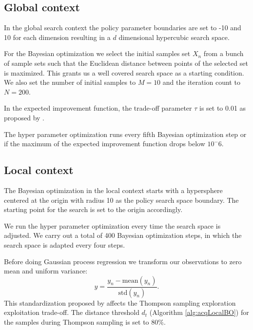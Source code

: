 \subsection{Global context}

In the global search context the policy parameter boundaries are set to -10 and 10 for each dimension resulting in a $d$ dimensional hypercubic search space.

For the Bayesian optimization we select the initial samples set $X_n$ from a bunch of sample sets such that the Euclidean distance between points of the selected set is maximized. This grants us a well covered search space as a starting condition. We also set the number of initial samples to $M = 10$ and the iteration count to $N = 200$.

In the expected improvement function, the trade-off parameter $\tau$ is set to 0.01 as proposed by \cite{brochu2010tutorial}.

The hyper parameter optimization runs every fifth Bayesian optimization step or if the maximum of the expected improvement function drops below $10^-6$.

\subsection{Local context}
The Bayesian optimization in the local context starts with a hypersphere centered at the origin with radius 10 as the policy search space boundary. The starting point for the search is set to the origin accordingly.

We run the hyper parameter optimization every time the search space is adjusted. We carry out a total of 400 Bayesian optimization steps, in which the search space is adapted every four steps.

Before doing Gaussian process regression we transform our observations to zero mean and uniform variance:
$$y = \frac{y_{n}-\mathrm{mean}(y_{n})}{\mathrm{std}(y_{n})}.$$
This standardization proposed by \cite{akrour2017local} affects the Thompson sampling exploration exploitation trade-off. The distance threshold $d_t$ (Algorithm \ref{alg:acqLocalBO}) for the samples during Thompson sampling is set to 80\%.
